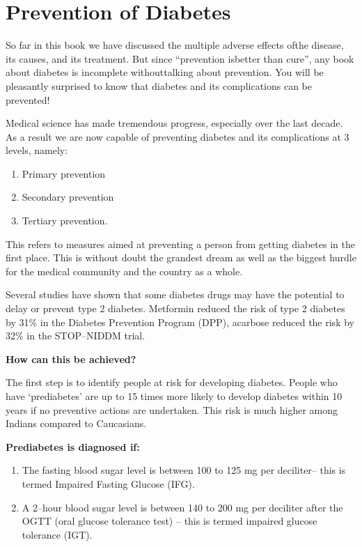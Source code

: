 \chapter{Prevention of Diabetes}\label{chap25}

So far in this book we have discussed the multiple adverse effects of\break the disease, its causes, and its treatment. But since “prevention is\break better than cure”, any book about diabetes is incomplete without\break talking about prevention. You will be pleasantly surprised to know that diabetes and its complications can be prevented!

Medical science has made tremendous progress, especially over the last decade. As a result we are now capable of preventing diabetes and its complications at 3 levels, namely:

\vspace{-\topsep}
\begin{enumerate}
\itemsep=0pt
\item Primary prevention
\item Secondary prevention
\item Tertiary prevention.
\end{enumerate}
\vspace{-\topsep}


This refers to measures aimed at preventing a person from getting diabetes in the first place. This is without doubt the grandest dream as well as the biggest hurdle for the medical community and the country as a whole.

Several studies have shown that some diabetes drugs may have the potential to delay or prevent type 2 diabetes. Metformin reduced the risk of type 2 diabetes by 31\% in the Diabetes Prevention Program (DPP), acarbose reduced the risk by 32\% in the STOP–NIDDM trial.

\noindent\textbf{How can this be achieved?}

The first step is to identify people at risk for developing diabetes. People who have ‘prediabetes’ are up to 15 times more likely to develop diabetes within 10 years if no preventive actions are undertaken. This risk is much higher among Indians compared to Caucasians.

\noindent\textbf{Prediabetes is diagnosed if:}

\vspace{-\topsep}
\begin{enumerate}[•]
\itemsep=0pt
\item The fasting blood sugar level is between 100 to 125 mg per deci\-li\-ter– this is termed Impaired Fasting Glucose (IFG).
\item A 2–hour blood sugar level is between 140 to 200 mg per deciliter after the OGTT (oral glucose tolerance test) – this is termed impaired glucose tolerance (IGT).
\end{enumerate}
\vspace{-\topsep}


